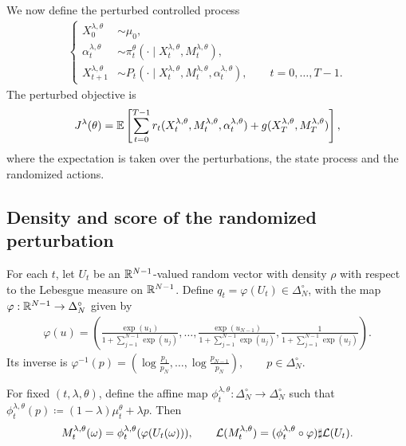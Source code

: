 We now define the perturbed controlled process
\begin{align}
    \begin{cases}
        X_0^{\lambda,\theta} &\sim \mu_0, \\
        \alpha_t^{\lambda,\theta} &\sim \pi_t^\theta(\cdot\mid X_t^{\lambda,\theta}, M_t^{\lambda,\theta}), \\
        X_{t+1}^{\lambda,\theta} &\sim P_t(\cdot\mid X_t^{\lambda,\theta}, M_t^{\lambda,\theta}, \alpha_t^{\lambda,\theta}),\qquad t=0,\ldots,T-1.
    \end{cases}
\end{align}
The perturbed objective is
\begin{align}
    J^\lambda(\theta) = \mathbb{E}\left[\sum_{t=0}^{T-1} r_t(X_t^{\lambda,\theta}, M_t^{\lambda,\theta}, \alpha_t^{\lambda,\theta}) + g(X_T^{\lambda,\theta}, M_T^{\lambda,\theta}) \right],
\end{align}
where the expectation is taken over the perturbations, the state process and the randomized actions.

\subsection{Density and score of the randomized perturbation}

For each $t$, let $U_t$ be an $\mathbb{R}^{N-1}$-valued random vector with density $\rho$ with respect to the Lebesgue measure on $\mathbb{R}^{N-1}$. Define $q_t = \varphi(U_t)\in\Delta_N^\circ$, with the map $\varphi : \mathbb{R}^{N-1}\to \Delta_N^\circ$ given by
\begin{align}
    \varphi(u) = \left( 
        \frac{\exp(u_1)}{1 + \sum_{j=1}^{N-1}\exp(u_j)},\ldots, \frac{\exp(u_{N-1})}{1 + \sum_{j=1}^{N-1}\exp(u_j)}, \frac{1}{1 + \sum_{j=1}^{N-1}\exp(u_j)}
    \right).
\end{align}
Its inverse is $\varphi^{-1}(p) = \left(\log\frac{p_1}{p_N},\ldots,\log\frac{p_{N-1}}{p_N} \right),\qquad p\in\Delta_N^\circ$.

For fixed $(t,\lambda,\theta)$, define the affine map $\phi_t^{\lambda, \theta}:\Delta_N^\circ\to\Delta_N^\circ$ such that $\phi_t^{\lambda,\theta}(p)\coloneqq (1-\lambda)\mu_t^\theta + \lambda p$. Then
\begin{align}
    M_t^{\lambda,\theta}(\omega) = \phi_t^{\lambda,\theta}(\varphi(U_t(\omega))),\qquad
    {\cal L}(M_t^{\lambda,\theta}) = (\phi_t^{\lambda,\theta} \circ \varphi)\sharp {\cal L}(U_t).
\end{align}

